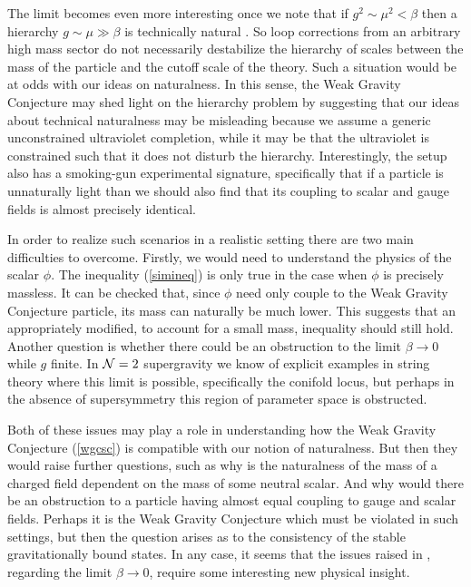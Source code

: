 \documentclass[11pt,a4paper]{article}
\numberwithin{equation}{section}
\numberwithin{table}{section}\setlength{\multlinegap}{25pt}
\begin{document}
The limit becomes even more interesting once we note that if $g^2\sim \mu^2 < \beta$ then a hierarchy $g \sim \mu \gg \beta$ is technically natural \cite{Lust:2017wrl}. So loop corrections from an arbitrary high mass sector do not necessarily destabilize the hierarchy of scales between the mass of the particle and the cutoff scale of the theory. Such a situation would be at odds with our ideas on naturalness. In this sense, the Weak Gravity Conjecture may shed light on the hierarchy problem by suggesting that our ideas about technical naturalness may be misleading because we assume a generic unconstrained ultraviolet completion, while it may be that the ultraviolet is constrained such that it does not disturb the hierarchy. Interestingly, the setup also has a smoking-gun experimental signature, specifically that if a particle is unnaturally light than we should also find that its coupling to scalar and gauge fields is almost precisely identical. 

In order to realize such scenarios in a realistic setting there are two main difficulties to overcome. Firstly, we would need to understand the physics of the scalar $\phi$. The inequality (\ref{simineq}) is only true in the case when $\phi$ is precisely massless. It can be checked that, since $\phi$ need only couple to the Weak Gravity Conjecture particle, its mass can naturally be much lower. This suggests that an appropriately modified, to account for a small mass, inequality should still hold. Another question is whether there could be an obstruction to the limit $\beta \rightarrow 0$ while $g$ finite. In ${\cal N}=2$ supergravity we know of explicit examples in string theory where this limit is possible, specifically the conifold locus, but perhaps in the absence of supersymmetry this region of parameter space is obstructed. 

Both of these issues may play a role in understanding how the Weak Gravity Conjecture (\ref{wgcsc}) is compatible with our notion of naturalness. But then they would raise further questions, such as why is the naturalness of the mass of a charged field dependent on the mass of some neutral scalar. And why would there be an obstruction to a particle having almost equal coupling to gauge and scalar fields. Perhaps it is the Weak Gravity Conjecture which must be violated in such settings, but then the question arises as to the consistency of the stable gravitationally bound states. In any case, it seems that the issues raised in \cite{Lust:2017wrl}, regarding the limit $\beta \rightarrow 0$, require some interesting new physical insight. 
\end{document}
